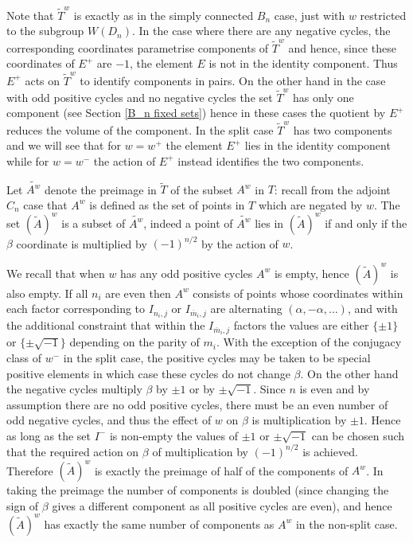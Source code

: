 \documentclass[11pt,a4paper]{article}
\def\Atilde{(\widetilde{A})}
\def\mbar{\overline{m}}
\def\mbar{\overline{m}}
\def\coveringtorus{\tilde{T}}
\def\wplus{w^+}
\def\wminus{w^-}
\begin{document}
Note that $\coveringtorus^w$ is exactly as in the simply connected $B_n$ case, just with $w$ restricted to the subgroup $W(D_n)$. In the case where there are any negative cycles, the corresponding coordinates parametrise components of $\coveringtorus^w$ and hence, since these coordinates of $E^+$ are $-1$, the element $E$ is not in the identity component. Thus $E^+$ acts on $\coveringtorus^w$ to identify components in pairs. On the other hand in the case with odd positive cycles and no negative cycles the set $\coveringtorus^w$ has only one component (see Section \ref{B_n fixed sets}) hence in these cases the quotient by $E^+$ reduces the volume of the component. In the split case $\coveringtorus^w$ has two components and we will see that for $w=\wplus$ the element $E^+$ lies in the identity component while for $w=\wminus$ the action of $E^+$ instead identifies the two components.





Let $\widetilde{A^w}$ denote the preimage in $\coveringtorus$ of the subset $A^w$ in $T$: recall from the adjoint $C_n$ case that $A^w$ is defined as the set of points in $T$ which are negated by $w$.  The set $\Atilde^w$ is a subset of $\widetilde{A^w}$, indeed a point of $\widetilde{A^w}$ lies in $\Atilde^w$ if and only if the $\beta$ coordinate is multiplied by $(-1)^{n/2}$ by the action of $w$.

We recall that when $w$ has any odd positive cycles $A^w$ is empty, hence $\Atilde^w$ is also empty. If all $n_i$ are even then $A^w$ consists of points whose coordinates within each factor corresponding to $I_{n_i,j}$ or $I_{\mbar_i,j}$ are alternating $(\alpha,-\alpha,\dots)$, and with the additional constraint that within the $I_{\mbar_i,j}$ factors the values are either $\{\pm1\}$ or $\{\pm \sqrt{-1}\}$ depending on the parity of $m_i$. With the exception of the conjugacy class of $\wminus$ in the split case, the positive cycles may be taken to be special positive elements in which case these cycles do not change $\beta$.  On the other hand the negative cycles multiply $\beta$ by $\pm1$ or by $\pm\sqrt{-1}$.  Since $n$ is even and by assumption there are no odd positive cycles, there must be an even number of odd negative cycles, and thus the effect of $w$ on $\beta$ is multiplication by $\pm1$. Hence as long as the set $I^-$ is non-empty the values of $\pm1$ or $\pm\sqrt{-1}$ can be chosen such that the required action on $\beta$ of multiplication by $(-1)^{n/2}$ is achieved. Therefore $\Atilde^w$ is exactly the preimage of half of the components of $A^w$. In taking the preimage the number of components is doubled (since changing the sign of $\beta$ gives a different component as all positive cycles are even), and hence $\Atilde^w$ has exactly the same number of components as $A^w$ in the non-split case.
\end{document}
